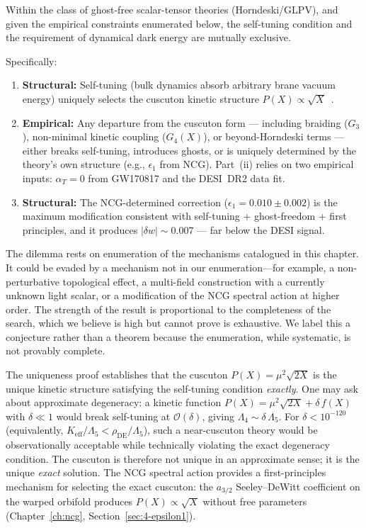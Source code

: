 \begin{conjecture}
\label{thm:horndeski}
Within the class of ghost-free scalar-tensor theories (Horndeski/GLPV), and given the empirical constraints enumerated below, the self-tuning condition and the requirement of dynamical dark energy are mutually exclusive.

Specifically:
\begin{enumerate}
  \item[\emph{(i)}] \textbf{Structural:} Self-tuning (bulk dynamics absorb arbitrary brane vacuum energy) uniquely selects the cuscuton kinetic structure $P(X) \propto \sqrt{X}$~\cite{ch3:afshordi2007,ch3:derham2016}.
  \item[\emph{(ii)}] \textbf{Empirical:} Any departure from the cuscuton form --- including braiding ($G_3$), non-minimal kinetic coupling ($G_{4}(X)$), or beyond-Horndeski terms --- either breaks self-tuning, introduces ghosts, or is uniquely determined by the theory's own structure (e.g., $\epsilon_1$ from NCG). Part~(ii) relies on two empirical inputs: $\alpha_T = 0$ from GW170817 and the DESI~DR2 data fit.
  \item[\emph{(iii)}] \textbf{Structural:} The NCG-determined correction ($\epsilon_1 = 0.010 \pm 0.002$) is the maximum modification consistent with self-tuning + ghost-freedom + first principles, and it produces $|\delta w| \sim 0.007$ --- far below the DESI signal.
\end{enumerate}
The dilemma rests on enumeration of the mechanisms catalogued in this chapter. It could be evaded by a mechanism not in our enumeration---for example, a non-perturbative topological effect, a multi-field construction with a currently unknown light scalar, or a modification of the NCG spectral action at higher order. The strength of the result is proportional to the completeness of the search, which we believe is high but cannot prove is exhaustive. We label this a conjecture rather than a theorem because the enumeration, while systematic, is not provably complete.

\begin{remark}
\label{rem:3-near-cuscuton}
The uniqueness proof establishes that the cuscuton $P(X) = \mu^2\sqrt{2X}$ is the unique kinetic structure satisfying the self-tuning condition \emph{exactly}. One may ask about approximate degeneracy: a kinetic function $P(X) = \mu^2\sqrt{2X} + \delta\,f(X)$ with $\delta \ll 1$ would break self-tuning at $\mathcal{O}(\delta)$, giving $\Lambda_4 \sim \delta\,\Lambda_5$. For $\delta < 10^{-120}$ (equivalently, $K_\mathrm{eff}/\Lambda_5 < \rho_\mathrm{DE}/\Lambda_5$), such a near-cuscuton theory would be observationally acceptable while technically violating the exact degeneracy condition. The cuscuton is therefore not unique in an approximate sense; it is the unique \emph{exact} solution. The NCG spectral action provides a first-principles mechanism for selecting the exact cuscuton: the $a_{3/2}$ Seeley--DeWitt coefficient on the warped orbifold produces $P(X) \propto \sqrt{X}$ without free parameters (Chapter~\ref{ch:ncg}, Section~\ref{sec:4-epsilon1}).
\end{remark}
\end{conjecture}


